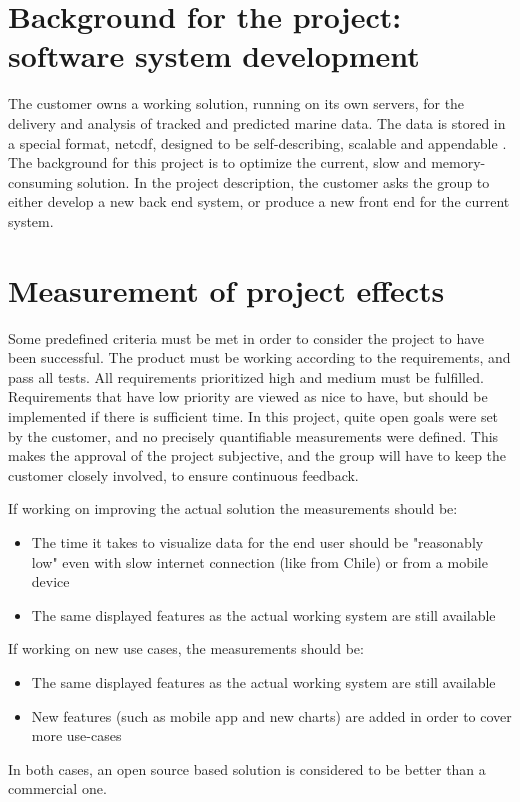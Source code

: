 \documentclass[11pt,a4paper,titlepage,oneside]{report}
\begin{document}
\section{Background for the project: software system development}
The customer owns a working solution, running on its own servers, for the delivery and analysis of  tracked and predicted marine data. The data is stored in a special format, \gls{netcdf}, designed to be self-describing, scalable and appendable \cite{netCDF:factsheet}.
The background for this project is to optimize the current, slow and memory-consuming solution. In the project description, the customer asks the group to either develop a new back end system, or produce a new front end for the current system. 

\section{Measurement of project effects}
\label{sec:MeasurementProjEff}
Some predefined criteria must be met in order to consider the project to have been successful. The product must be working according to the requirements, and pass all tests. All requirements prioritized high and medium must be fulfilled. Requirements that have low priority are viewed as nice to have, but should be implemented if there is sufficient time.
In this project, quite open goals were set by the customer, and no precisely quantifiable measurements were defined. This makes the approval of the project subjective, and the group will have to keep the customer closely involved, to ensure continuous feedback.

If working on improving the actual solution the measurements should be:
\begin{itemize}
\item The time it takes to visualize data for the end user should be "reasonably low" even with slow internet connection (like from Chile) or from a mobile device
\item The same displayed features as the actual working system are still available
\end{itemize}

If working on new use cases, the measurements should be:
\begin{itemize}
\item The same displayed features as the actual working system are still available
\item New features (such as mobile app and new charts) are added in order to cover more use-cases 
\end{itemize}
In both cases, an open source based solution is considered to be better than a commercial one.
\end{document}
